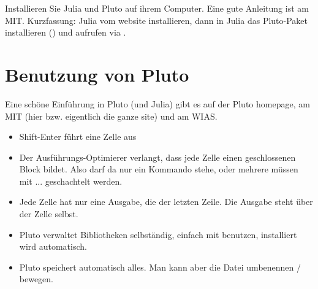  Installieren Sie   Julia und Pluto auf ihrem Computer. Eine gute Anleitung ist am MIT. Kurzfassung: Julia vom website installieren, dann in Julia das Pluto-Paket installieren () und aufrufen via . 





\section{Benutzung von Pluto}

Eine schöne Einführung in Pluto (und Julia) gibt es auf der Pluto homepage,
 am MIT 
(hier
bzw. eigentlich die ganze site)
und am WIAS.

\begin{itemize}
\item Shift-Enter führt eine Zelle aus

\item Der Ausführungs-Optimierer verlangt, dass jede Zelle einen geschlossenen Block bildet. Also darf da nur ein Kommando stehe, oder mehrere müssen mit   ...   geschachtelt werden.

\item Jede Zelle hat nur eine Ausgabe, die der letzten Zeile. Die Ausgabe steht über der Zelle selbst.

\item Pluto verwaltet Bibliotheken selbständig, einfach mit   benutzen, installiert wird automatisch.

\item Pluto speichert automatisch alles. Man kann aber die Datei umbenennen / bewegen.



\end{itemize}




